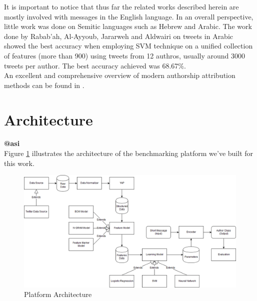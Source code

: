 \documentclass[a4paper]{article}
\begin{document}
It is important to notice that thus far the related works described herein are mostly involved with messages in the English language. In an overall perspective, little work was done on Semitic languages such as Hebrew and Arabic. The work done by Rabab’ah, Al-Ayyoub, Jararweh and Aldwairi \cite{rabab} on tweets in Arabic showed the best accuracy when employing SVM technique on a unified collection of features (more than 900) using tweets from 12 authros, usually around 3000 tweets per author. The best accuracy achieved was 68.67\%.\\
An excellent and comprehensive overview of modern authorship attribution methods can be found in \cite{stamatatos}.



\section{Architecture}
\label{Architecture}
\textbf{@asi}\\

Figure \ref{fig:architecture} illustrates the architecture of the benchmarking platform we've built for this work.\\
\begin{figure}[hb]
	\includegraphics[width=1\textwidth]{"architecture/NLP Author Classification Architecture"}
	\caption{Platform Architecture}
		\label{fig:architecture}
\end{figure}\\
\end{document}
